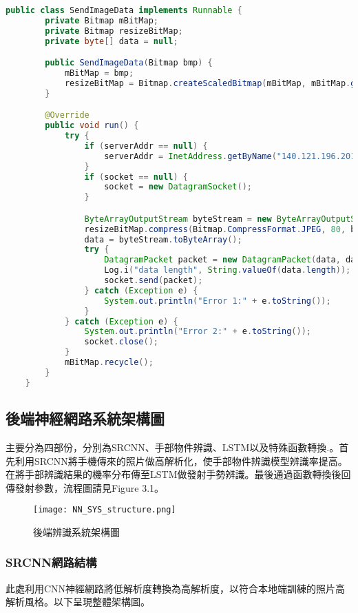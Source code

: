 \begin{lstlisting}[language=Java, caption=傳輸影像至伺服器端]
public class SendImageData implements Runnable {
        private Bitmap mBitMap;
        private Bitmap resizeBitMap;
        private byte[] data = null;

        public SendImageData(Bitmap bmp) {
            mBitMap = bmp;
            resizeBitMap = Bitmap.createScaledBitmap(mBitMap, mBitMap.getWidth() / 10, mBitMap.getHeight() / 10, true);
        }

        @Override
        public void run() {
            try {
                if (serverAddr == null) {
                    serverAddr = InetAddress.getByName("140.121.196.201");
                }
                if (socket == null) {
                    socket = new DatagramSocket();
                }

                ByteArrayOutputStream byteStream = new ByteArrayOutputStream();
                resizeBitMap.compress(Bitmap.CompressFormat.JPEG, 80, byteStream);
                data = byteStream.toByteArray();
                try {
                    DatagramPacket packet = new DatagramPacket(data, data.length, serverAddr, 5000);
                    Log.i("data length", String.valueOf(data.length));
                    socket.send(packet);
                } catch (Exception e) {
                    System.out.println("Error 1:" + e.toString());
                }
            } catch (Exception e) {
                System.out.println("Error 2:" + e.toString());
                socket.close();
            }
            mBitMap.recycle();
        }
    }
\end{lstlisting}
\subsection{後端神經網路系統架構圖}

主要分為四部份，分別為SRCNN、手部物件辨識、LSTM以及特殊函數轉換.。首先利用SRCNN將手機傳來的照片做高解析化，使手部物件辨識模型辨識率提高。在將手部辨識結果的機率分布傳至LSTM做發射手勢辨識。最後通過函數轉換後回傳發射參數，流程圖請見Figure 3.1。

\begin{figure}[H]
    \centering
    \texttt{[image: NN\_SYS\_structure.png]}
    \caption{後端辨識系統架構圖}
    \label{fig:後端辨識系統架構圖}
\end{figure}

\subsubsection{SRCNN網路結構}
此處利用CNN神經網路將低解析度轉換為高解析度，以符合本地端訓練的照片高解析風格。以下呈現整體架構圖。

